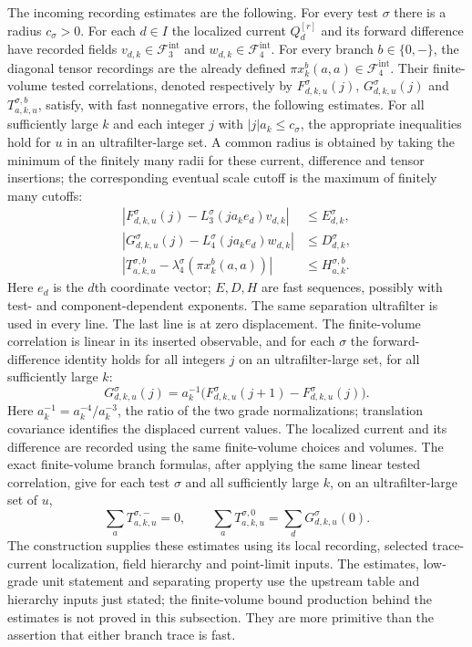 The incoming recording estimates are the following. For every test $\sigma$
there is a radius $c_\sigma>0$. For each $d\in I$ the localized current
$Q_d^{[r]}$ and its forward difference have recorded fields
$v_{d,k}\in\mathcal F_3^{\mathrm{int}}$ and $w_{d,k}\in\mathcal F_4^{\mathrm{int}}$. For every branch
$b\in\{0,-\}$, the diagonal tensor recordings are the already defined
$\pi x^b_k(a,a)\in\mathcal F_4^{\mathrm{int}}$. Their finite-volume tested correlations,
denoted respectively by $F^{\sigma}_{d,k,u}(j)$, $G^{\sigma}_{d,k,u}(j)$ and
$T^{\sigma,b}_{a,k,u}$, satisfy, with fast nonnegative errors, the following
estimates. For all sufficiently large $k$ and each integer $j$ with
$|j|a_k\le c_\sigma$, the appropriate inequalities hold for $u$ in an
ultrafilter-large set. A common radius is obtained by taking the minimum
of the finitely many radii for these current, difference and tensor
insertions; the corresponding eventual scale cutoff is the maximum of
finitely many cutoffs:
\begin{align}
 |F^{\sigma}_{d,k,u}(j)-L^{\sigma}_3(ja_ke_d)v_{d,k}|&\le E^{\sigma}_{d,k},
 \label{eq:ex-branch-book-current}\\
 |G^{\sigma}_{d,k,u}(j)-L^{\sigma}_4(ja_ke_d)w_{d,k}|&\le D^{\sigma}_{d,k},
 \label{eq:ex-branch-book-difference}\\
 |T^{\sigma,b}_{a,k,u}-\lambda^{\sigma}_4(\pi x^b_k(a,a))|&\le H^{\sigma,b}_{a,k}.
 \label{eq:ex-branch-book-tensor}
\end{align}
Here $e_d$ is the $d$th coordinate vector; $E,D,H$ are fast sequences,
possibly with test- and component-dependent exponents. The same separation
ultrafilter is used in every line. The last line is at zero displacement.
The finite-volume correlation is linear in its inserted observable, and
for each $\sigma$ the forward-difference identity holds for all integers
$j$ on an ultrafilter-large set, for all sufficiently large $k$:
\begin{equation}
 G^{\sigma}_{d,k,u}(j)=a_k^{-1}
 \bigl(F^{\sigma}_{d,k,u}(j+1)-F^{\sigma}_{d,k,u}(j)\bigr).
 \label{eq:ex-branch-recorded-difference}
\end{equation}
Here $a_k^{-1}=a_k^{-4}/a_k^{-3}$, the ratio of the two grade
normalizations; translation covariance identifies the displaced current values.
The localized current and its difference are recorded using the same finite-volume choices
and volumes. The exact finite-volume branch formulas, after applying the
same linear tested correlation, give for each test $\sigma$ and all
sufficiently large $k$, on an ultrafilter-large set of $u$,
\begin{equation}
 \sum_aT^{\sigma,-}_{a,k,u}=0,\qquad
 \sum_aT^{\sigma,0}_{a,k,u}=\sum_dG^{\sigma}_{d,k,u}(0).
 \label{eq:ex-branch-recorded-traces}
\end{equation}
The construction supplies these estimates using its local
recording, selected trace-current localization, field hierarchy and
point-limit inputs. The estimates, low-grade unit statement and separating
property use the upstream table and hierarchy inputs just stated; the
finite-volume bound production behind the estimates is not proved in this
subsection. They are more primitive than the assertion that either branch
trace is fast.

